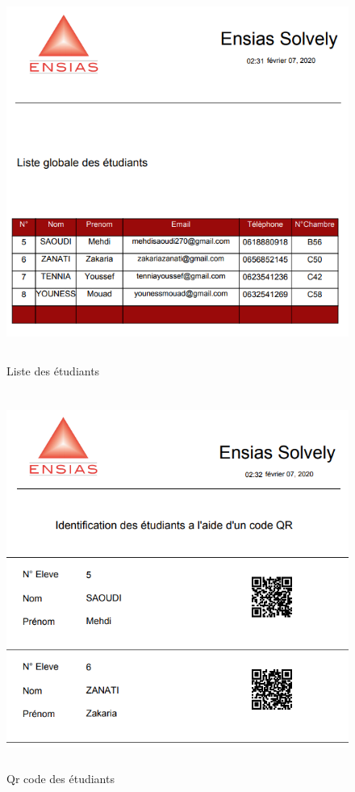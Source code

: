 \documentclass[11.5pt]{report}
\begin{document}
\newpage
\begin{figure}[h]
	
	\begin{center}
		\includegraphics[width=500pt,height=350pt]{studentslist.png} 
		\caption{Liste des étudiants}
	\end{center}
	
\end{figure}
\newpage
\begin{figure}[h]
	
	\begin{center}
		\includegraphics[width=500pt,height=350pt]{studentsqr.png} 
		\caption{Qr code des étudiants}
	\end{center}
	
\end{figure}
\end{document}
